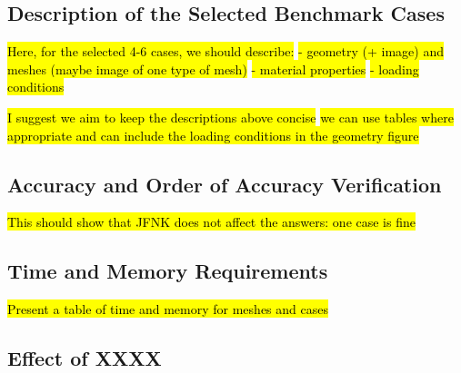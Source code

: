 \documentclass[sn-mathphys,Numbered]{sn-jnl}%
\begin{document}
\subsection{Description of the Selected Benchmark Cases}

\hl{Here, for the selected 4-6 cases, we should describe:}
\hl{- geometry (+ image) and meshes (maybe image of one type of mesh)}
\hl{- material properties}
\hl{- loading conditions}

\hl{I suggest we aim to keep the descriptions above concise}
\hl{we can use tables where appropriate and can include the loading conditions in the geometry figure}

\subsection{Accuracy and Order of Accuracy Verification}

\hl{This should show that JFNK does not affect the answers: one case is fine}


\subsection{Time and Memory Requirements}

\hl{Present a table of time and memory for meshes and cases}



\subsection{Effect of XXXX}
\end{document}
